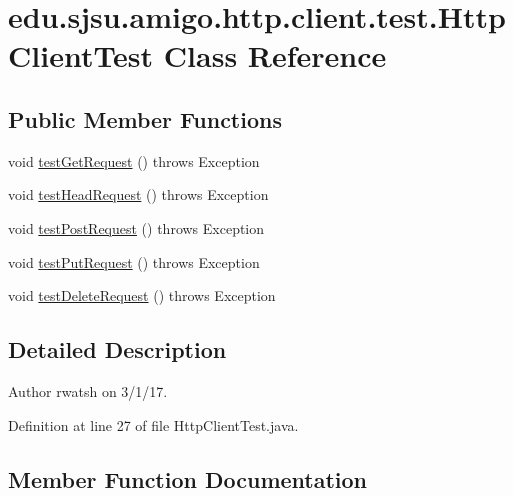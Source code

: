 \hypertarget{classedu_1_1sjsu_1_1amigo_1_1http_1_1client_1_1test_1_1_http_client_test}{}\section{edu.\+sjsu.\+amigo.\+http.\+client.\+test.\+Http\+Client\+Test Class Reference}
\label{classedu_1_1sjsu_1_1amigo_1_1http_1_1client_1_1test_1_1_http_client_test}
\subsection*{Public Member Functions}
\begin{DoxyCompactItemize}
\item 
void \hyperlink{classedu_1_1sjsu_1_1amigo_1_1http_1_1client_1_1test_1_1_http_client_test_a29fe9b50acbc54ea293dbd80153a1ec0}{test\+Get\+Request} ()  throws Exception 
\item 
void \hyperlink{classedu_1_1sjsu_1_1amigo_1_1http_1_1client_1_1test_1_1_http_client_test_a3c5ff58112a4406f4c9a615aa499f631}{test\+Head\+Request} ()  throws Exception 
\item 
void \hyperlink{classedu_1_1sjsu_1_1amigo_1_1http_1_1client_1_1test_1_1_http_client_test_aa2c29c6793e839c77c3a13f2cde9bf83}{test\+Post\+Request} ()  throws Exception 
\item 
void \hyperlink{classedu_1_1sjsu_1_1amigo_1_1http_1_1client_1_1test_1_1_http_client_test_a86b670d0865fd4997b2c485d0e035271}{test\+Put\+Request} ()  throws Exception 
\item 
void \hyperlink{classedu_1_1sjsu_1_1amigo_1_1http_1_1client_1_1test_1_1_http_client_test_a8aa3f333df1ec3f182b01401f2890e7d}{test\+Delete\+Request} ()  throws Exception 
\end{DoxyCompactItemize}


\subsection{Detailed Description}
\begin{DoxyAuthor}{Author}
rwatsh on 3/1/17. 
\end{DoxyAuthor}


Definition at line 27 of file Http\+Client\+Test.\+java.



\subsection{Member Function Documentation}
\mbox{\label{classedu_1_1sjsu_1_1amigo_1_1http_1_1client_1_1test_1_1_http_client_test_a8aa3f333df1ec3f182b01401f2890e7d}} 
